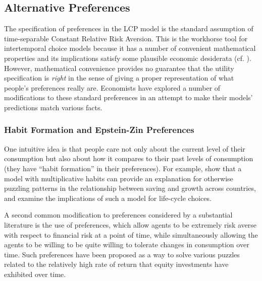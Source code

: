 \documentclass{article}
\begin{document}
\subsection{Alternative Preferences}

The specification of preferences in the LCP model is the standard assumption of time-separable Constant Relative Risk Aversion.
This is the workhorse tool for intertemporal choice models because it has a number of convenient mathematical properties and its implications satisfy some plausible economic desiderata (cf. \cite{kimballStandardRA}).
However, mathematical convenience provides no guarantee that the utility specification is \textit{right} in the sense of giving a proper representation of what people's preferences really are.
Economists have explored a number of modifications to these standard preferences in an attempt to make their models' predictions match various facts.

\subsubsection{Habit Formation and Epstein-Zin Preferences}

One intuitive idea is that people care not only about the current level of their consumption but also about how it compares to their past levels of consumption (they have ``habit formation'' in their preferences).
For example, \cite{Carroll_2000} show that a model with multiplicative habits can provide an explanation for otherwise puzzling patterns in the relationship between saving and growth across countries, and
\cite{Michaelides_2002} examine the implications of such a model for life-cycle choices.

A second common modification to preferences considered by a substantial literature is the use of \cite{Epstein_1991} preferences, which allow agents to be extremely risk averse with respect to financial risk at a point of time, while simultaneously allowing the agents to be willing to be quite willing to tolerate changes in consumption over time.
Such preferences have been proposed as a way to solve various puzzles related to the relatively high rate of return that equity investments have exhibited over time.
\end{document}
